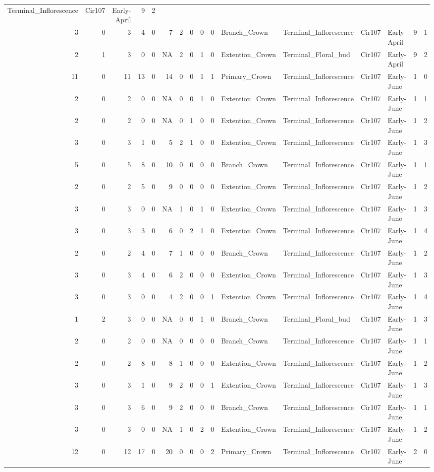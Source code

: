 \documentclass[]{article}
\begin{document}
\begin{longtable}[]{@{}rrrrrrrrrrllllrl@{}}
Terminal\_Inflorescence & Cir107 & Early-April & 9 & 2\tabularnewline
3 & 0 & 3 & 4 & 0 & 7 & 2 & 0 & 0 & 0 & Branch\_Crown &
Terminal\_Inflorescence & Cir107 & Early-April & 9 & 1\tabularnewline
2 & 1 & 3 & 0 & 0 & NA & 2 & 0 & 1 & 0 & Extention\_Crown &
Terminal\_Floral\_bud & Cir107 & Early-April & 9 & 2\tabularnewline
11 & 0 & 11 & 13 & 0 & 14 & 0 & 0 & 1 & 1 & Primary\_Crown &
Terminal\_Inflorescence & Cir107 & Early-June & 1 & 0\tabularnewline
2 & 0 & 2 & 0 & 0 & NA & 0 & 0 & 1 & 0 & Extention\_Crown &
Terminal\_Inflorescence & Cir107 & Early-June & 1 & 1\tabularnewline
2 & 0 & 2 & 0 & 0 & NA & 0 & 1 & 0 & 0 & Extention\_Crown &
Terminal\_Inflorescence & Cir107 & Early-June & 1 & 2\tabularnewline
3 & 0 & 3 & 1 & 0 & 5 & 2 & 1 & 0 & 0 & Extention\_Crown &
Terminal\_Inflorescence & Cir107 & Early-June & 1 & 3\tabularnewline
5 & 0 & 5 & 8 & 0 & 10 & 0 & 0 & 0 & 0 & Branch\_Crown &
Terminal\_Inflorescence & Cir107 & Early-June & 1 & 1\tabularnewline
2 & 0 & 2 & 5 & 0 & 9 & 0 & 0 & 0 & 0 & Extention\_Crown &
Terminal\_Inflorescence & Cir107 & Early-June & 1 & 2\tabularnewline
3 & 0 & 3 & 0 & 0 & NA & 1 & 0 & 1 & 0 & Extention\_Crown &
Terminal\_Inflorescence & Cir107 & Early-June & 1 & 3\tabularnewline
3 & 0 & 3 & 3 & 0 & 6 & 0 & 2 & 1 & 0 & Extention\_Crown &
Terminal\_Inflorescence & Cir107 & Early-June & 1 & 4\tabularnewline
2 & 0 & 2 & 4 & 0 & 7 & 1 & 0 & 0 & 0 & Branch\_Crown &
Terminal\_Inflorescence & Cir107 & Early-June & 1 & 2\tabularnewline
3 & 0 & 3 & 4 & 0 & 6 & 2 & 0 & 0 & 0 & Extention\_Crown &
Terminal\_Inflorescence & Cir107 & Early-June & 1 & 3\tabularnewline
3 & 0 & 3 & 0 & 0 & 4 & 2 & 0 & 0 & 1 & Extention\_Crown &
Terminal\_Inflorescence & Cir107 & Early-June & 1 & 4\tabularnewline
1 & 2 & 3 & 0 & 0 & NA & 0 & 0 & 1 & 0 & Branch\_Crown &
Terminal\_Floral\_bud & Cir107 & Early-June & 1 & 3\tabularnewline
2 & 0 & 2 & 0 & 0 & NA & 0 & 0 & 0 & 0 & Branch\_Crown &
Terminal\_Inflorescence & Cir107 & Early-June & 1 & 1\tabularnewline
2 & 0 & 2 & 8 & 0 & 8 & 1 & 0 & 0 & 0 & Extention\_Crown &
Terminal\_Inflorescence & Cir107 & Early-June & 1 & 2\tabularnewline
3 & 0 & 3 & 1 & 0 & 9 & 2 & 0 & 0 & 1 & Extention\_Crown &
Terminal\_Inflorescence & Cir107 & Early-June & 1 & 3\tabularnewline
3 & 0 & 3 & 6 & 0 & 9 & 2 & 0 & 0 & 0 & Branch\_Crown &
Terminal\_Inflorescence & Cir107 & Early-June & 1 & 1\tabularnewline
3 & 0 & 3 & 0 & 0 & NA & 1 & 0 & 2 & 0 & Extention\_Crown &
Terminal\_Inflorescence & Cir107 & Early-June & 1 & 2\tabularnewline
12 & 0 & 12 & 17 & 0 & 20 & 0 & 0 & 0 & 2 & Primary\_Crown &
Terminal\_Inflorescence & Cir107 & Early-June & 2 & 0\tabularnewline

\end{longtable}
\end{document}
